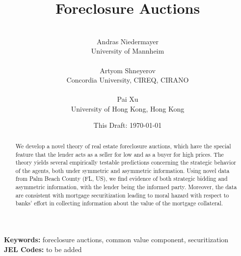 \documentclass[11pt,twopage]{article}
\begin{document}
\title{Foreclosure Auctions} \author{
  \\
  Andras Niedermayer\\
  {University of Mannheim}\\
  \\
  Artyom Shneyerov\\
  {Concordia University, CIREQ, CIRANO}\\ \\
  Pai Xu\\
  {University of Hong Kong, Hong Kong} }

\date{This Draft: \today}

\thispagestyle{empty}
\maketitle

\begin{abstract}

  We develop a novel theory of real estate foreclosure auctions, which
  have the special feature that the lender acts as a seller for low
  and as a buyer for high prices. The theory yields several
  empirically testable predictions concerning the strategic behavior
  of the agents, both under symmetric and asymmetric
  information. Using novel data from Palm Beach County (FL, US), we
  find evidence of both strategic bidding and asymmetric information,
  with the lender being the informed party. Moreover, the data are
  consistent with mortgage securitization leading to moral hazard with
  respect to banks' effort in collecting information about the value
  of the mortgage collateral.

%
\end{abstract}

\setlength{\baselineskip}{1.5\baselineskip}

\noindent \textbf{Keywords: } foreclosure auctions, common value component, securitization \\
\textbf{JEL Codes: } to be added
\end{document}
